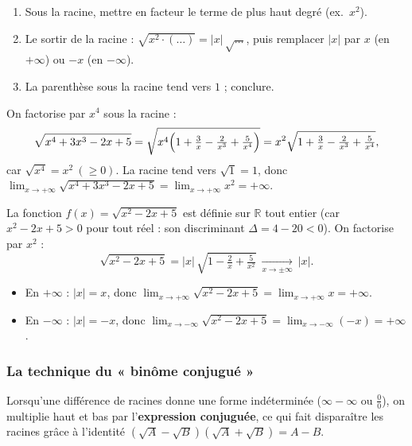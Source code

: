 \documentclass[11pt,a4paper]{article}
\newcommand{\R}{\mathbb{R}}
\begin{document}
\begin{methode}
\begin{enumerate}[leftmargin=1.9em,topsep=2pt,itemsep=2pt]
  \item Sous la racine, mettre en facteur le terme de plus haut degré (ex.\ $x^2$).
  \item Le sortir de la racine : $\sqrt{x^2\cdot(\dots)}=|x|\,\sqrt{\dots}$, puis remplacer $|x|$ par $x$ (en $+\infty$) ou $-x$ (en $-\infty$).
  \item La parenthèse sous la racine tend vers $1$ ; conclure.
\end{enumerate}
\end{methode}

\begin{exemple}
On factorise par $x^4$ sous la racine :
\[ \sqrt{x^4+3x^3-2x+5}=\sqrt{x^4\Bigl(1+\tfrac3x-\tfrac{2}{x^3}+\tfrac{5}{x^4}\Bigr)}
   =x^{2}\sqrt{1+\tfrac3x-\tfrac{2}{x^3}+\tfrac{5}{x^4}}, \]
car $\sqrt{x^4}=x^2\ (\geq 0)$. La racine tend vers $\sqrt1=1$, donc
$\displaystyle\lim_{x\to+\infty}\sqrt{x^4+3x^3-2x+5}=\lim_{x\to+\infty} x^2=+\infty.$
\end{exemple}

\begin{exemple}
La fonction $f(x)=\sqrt{x^2-2x+5}$ est définie sur $\R$ tout entier (car $x^2-2x+5>0$ pour tout
réel : son discriminant $\Delta=4-20<0$). On factorise par $x^2$ :
\[ \sqrt{x^2-2x+5}=|x|\,\sqrt{1-\tfrac2x+\tfrac{5}{x^2}}\ \xrightarrow[x\to\pm\infty]{}\ |x|. \]
\begin{itemize}[leftmargin=1.6em,topsep=2pt]
  \item En $+\infty$ : $|x|=x$, donc $\displaystyle\lim_{x\to+\infty}\sqrt{x^2-2x+5}=\lim_{x\to+\infty} x=+\infty$.
  \item En $-\infty$ : $|x|=-x$, donc $\displaystyle\lim_{x\to-\infty}\sqrt{x^2-2x+5}=\lim_{x\to-\infty}(-x)=+\infty$.
\end{itemize}
\end{exemple}

\subsubsection{La technique du « binôme conjugué »}

Lorsqu'une différence de racines donne une forme indéterminée ($\infty-\infty$ ou $\tfrac00$), on
multiplie haut et bas par l'\textbf{expression conjuguée}, ce qui fait disparaître les racines
grâce à l'identité $(\sqrt{A}-\sqrt{B})(\sqrt{A}+\sqrt{B})=A-B$.
\end{document}
